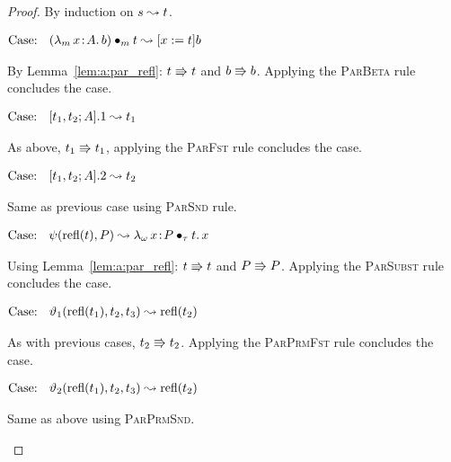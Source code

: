 \begin{proof}
    By induction on $s \leadsto t$.

    $\text{Case: }\begin{array}{c} ({\lambda_m}\, x\! : \! A.\, b) \bullet_{m} t \leadsto [x := t]b \end{array}$
    \begin{proofcase}
        By Lemma~\ref{lem:a:par_refl}: $t \Rrightarrow t$ and $b \Rrightarrow b$.
        Applying the \textsc{ParBeta} rule concludes the case.
    \end{proofcase}

    $\text{Case: }\begin{array}{c} [t_1, t_2; A].1 \leadsto t_1 \end{array}$
    \begin{proofcase}
        As above, $t_1 \Rrightarrow t_1$, applying the \textsc{ParFst} rule concludes the case.
    \end{proofcase}

    $\text{Case: }\begin{array}{c} [t_1, t_2; A].2 \leadsto t_2 \end{array}$
    \begin{proofcase}
        Same as previous case using \textsc{ParSnd} rule.
    \end{proofcase}

    $\text{Case: }\begin{array}{c} \psi(\text{refl}(t),P) \leadsto {\lambda_\omega}\, x\! : \! P \bullet_{\tau} t.\, x \end{array}$
    \begin{proofcase}
        Using Lemma~\ref{lem:a:par_refl}: $t \Rrightarrow t$ and $P \Rrightarrow P$.
        Applying the \textsc{ParSubst} rule concludes the case.
    \end{proofcase}

    $\text{Case: }\begin{array}{c} \vartheta_1(\text{refl}(t_1), t_2, t_3) \leadsto \text{refl}(t_2) \end{array}$
    \begin{proofcase}
        As with previous cases, $t_2 \Rrightarrow t_2$.
        Applying the \textsc{ParPrmFst} rule concludes the case.
    \end{proofcase}

    $\text{Case: }\begin{array}{c} \vartheta_2(\text{refl}(t_1), t_2, t_3) \leadsto \text{refl}(t_2) \end{array}$
    \begin{proofcase}
        Same as above using \textsc{ParPrmSnd}.
    \end{proofcase}


\end{proof}
